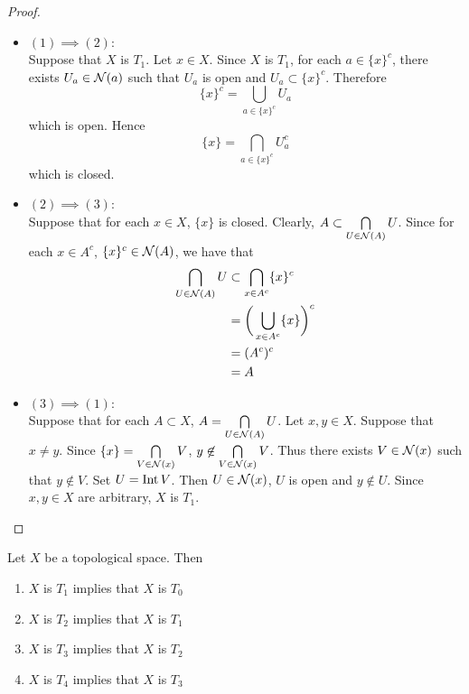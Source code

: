 \documentclass{book}
\begin{document}
	\begin{proof}\
		\begin{itemize}
			\item $(1) \implies (2)$: \\
			Suppose that $X$ is $T_1$. Let $x \in X$. Since $X$ is $T_1$, for each $a \in \{x\}^c$, there exists $U_{a} \in \mathcal{N}(a)$ such that $U_a$ is open and $U_{a} \subset \{x\}^c$. Therefore 
			$$\{x\}^c = \bigcup_{a \in \{x\}^c} U_a$$ 
			which is open. Hence 
			$$\{x\} = \bigcap_{a \in \{x\}^c} U_a^c$$
			which is closed. \\
			\item $(2) \implies (3)$: \\
			Suppose that for each $x \in X$, $\{x\}$ is closed. Clearly, $A \subset \bigcap\limits_{U \in \mathcal{N}(A)} U$. Since for each $x \in A^c$, $\{x\}^c \in \mathcal{N}(A)$, we have that 
			\begin{align*}
				\bigcap_{U \in \mathcal{N}(A)} U
				& \subset \bigcap_{x \in A^c} \{x\}^c \\
				& = \bigg( \bigcup_{x \in A^c} \{x\} \bigg)^c \\
				& = (A^c)^c \\
				& = A
			\end{align*}
			\item $(3) \implies (1)$: \\
			Suppose that for each $A \subset X$, $A = \bigcap\limits_{U \in \mathcal{N}(A)} U$. Let $x, y \in X$. Suppose that $x \neq y$. Since $\{x\} = \bigcap\limits_{V \in \mathcal{N}(x)} V$, $y \not \in  \bigcap\limits_{V \in \mathcal{N}(x)} V$. Thus there exists $V \in \mathcal{N}(x)$ such that $y \not \in V$. Set $U = \operatorname{Int} V$. Then $U \in \mathcal{N}(x)$, $U$ is open and $y \not \in U$. Since $x, y \in X$ are arbitrary, $X$ is $T_1$.
		\end{itemize}
	\end{proof}

	\begin{ex} 
		Let $X$ be a topological space. Then 
		\begin{enumerate}
			\item $X$ is $T_1$ implies that $X$ is $T_0$
			\item $X$ is $T_2$ implies that $X$ is $T_1$
			\item $X$ is $T_3$ implies that $X$ is $T_2$ 
			\item $X$ is $T_4$ implies that $X$ is $T_3$ 
		\end{enumerate}
	\end{ex}
	
\end{document}

